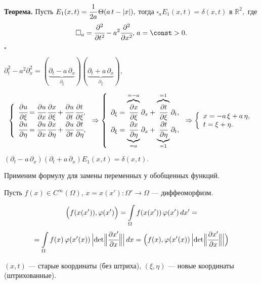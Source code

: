 \documentclass[unicode,12pt,draft]{article}
\begin{document}
\textbf{Теорема.} Пусть $E_1(x,t)=\cfrac1{2a}\,\Theta(a\,t-|x|),$
тогда $\square_a E_1(x,t)=\delta(x,t)$ в $\mathbb R^2,$ где
$$\square_a=\cfrac{\partial^2}{\partial
t^2}-a^2\cfrac{\partial^2}{\partial x^2},\,a=\const  >0.$$

$\square$

$\partial_t^2-a^2\partial_x^2=(\underbrace{\partial_t-a\,\partial_x}_{\partial_{\xi}})
(\underbrace{\partial_t+a\,\partial_x}_{\partial_{\xi}}),$

$$
\left\{%
\begin{array}{ll}
    \cfrac{\partial u}{\partial\xi}=\cfrac{\partial u}{\partial x}\,\cfrac{\partial x}{\partial\xi}+
    \cfrac{\partial u}{\partial t}\,\cfrac{\partial t}{\partial\xi},  \\
    \cfrac{\partial u}{\partial\eta}=\cfrac{\partial u}{\partial x}\,\cfrac{\partial x}{\partial\eta}+
    \cfrac{\partial u}{\partial t}\,\cfrac{\partial t}{\partial\eta}, \\
\end{array}%
\right.   \Rightarrow
\left\{%
\begin{array}{ll}
    \partial_\xi=\overbrace{\cfrac{\partial x}{\partial\xi}}^{=-a}\partial_x+
    \overbrace{\cfrac{\partial t}{\partial\xi}}^{=1}\partial_t,  \\
    \partial_\xi=\underbrace{\cfrac{\partial x}{\partial\eta}}_{=a}\partial_x+
    \underbrace{\cfrac{\partial t}{\partial\eta}}_{=1}\partial_t, \\
\end{array}%
\right. \Rightarrow
\left\{%
\begin{array}{ll}
    x=-a\,\xi +a\,\eta,  \\
    t=\xi + \eta. \\
\end{array}%
\right.
 $$

$(\partial_t-a\,\partial_x)(\partial_t+a\,\partial_x)E_1(x,t)=\delta(x,t).$

Применим формулу для замены переменных у обобщенных функций.

Пусть $f(x)\in C^{\infty}(\Omega),\, x=x(x')\colon
\Omega'\to\Omega$ --- диффеоморфизм.

$$\Bigl(f(x(x')),\varphi(x')\Bigr)=\int\limits_{\Omega}f(x(x'))\,\varphi(x')\,dx'=$$
$$=\int\limits_{\Omega}f(x)\,\varphi(x'(x))\,\Bigl|\det\Bigl\|
\cfrac{\partial x'}{\partial x}\Bigr\|\Bigr|\,dx=
\Bigl(f(x),\varphi(x'(x))\,\Bigl|\det\Bigl\| \cfrac{\partial
x'}{\partial x}\Bigr\|\Bigr|\Bigr)$$

$(x,t)$ --- старые координаты (без штриха), $(\xi,\eta)$ --- новые
координаты (штрихованные).
\end{document}
